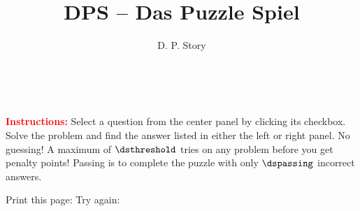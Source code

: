 \documentclass{article}
\title{DPS -- Das Puzzle Spiel}
\author{D. P. Story}
\begin{document}
\begin{center}\bfseries\Large\color{blue}
    \webtitle\\[1ex]\webauthor
\end{center}

\textcolor{red}{\textbf{Instructions:}} Select a question from the
center panel by clicking its checkbox. Solve the problem and find
the answer listed in either the left or right panel.  No guessing!
A maximum of $\dsthreshold $ tries on any problem before you get
penalty points!  Passing is to complete the puzzle with only
$\dspassing$ incorrect answers.


%
%


Print this page: \printDPS{}{11bp}\cgBdry[1ex]
Try again: \resetDPS{}{11bp}
\end{document}
